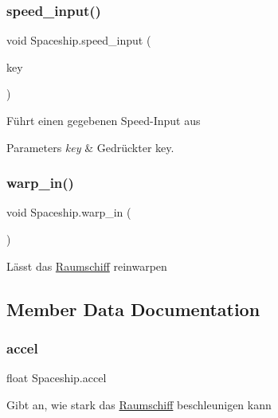\subsubsection{\texorpdfstring{speed\+\_\+input()}{speed\_input()}}
{\footnotesize\ttfamily void Spaceship.\+speed\+\_\+input (\begin{DoxyParamCaption}\item[{Movement\+Input\+Keys}]{key }\end{DoxyParamCaption})}



Führt einen gegebenen Speed-\/\+Input aus 


\begin{DoxyParams}{Parameters}
{\em key} & Gedrückter key.\\
\hline
\end{DoxyParams}
\mbox{\label{class_spaceship_a4a932f067ed922c34f82fa4479dbdf4d}} 
\subsubsection{\texorpdfstring{warp\+\_\+in()}{warp\_in()}}
{\footnotesize\ttfamily void Spaceship.\+warp\+\_\+in (\begin{DoxyParamCaption}{ }\end{DoxyParamCaption})}



Lässt das \hyperlink{class_raumschiff}{Raumschiff} reinwarpen 



\subsection{Member Data Documentation}
\mbox{\label{class_spaceship_a28d8649c7000f2f6626f88663b4248be}} 
\subsubsection{\texorpdfstring{accel}{accel}}
{\footnotesize\ttfamily float Spaceship.\+accel}



Gibt an, wie stark das \hyperlink{class_raumschiff}{Raumschiff} beschleunigen kann 


